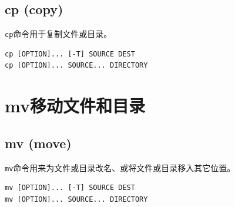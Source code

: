 \documentclass[12pt, openany, oneside]{book}
\begin{document}
\subsection{cp (copy)}

\lstinline|cp|命令用于复制文件或目录。

\vspace{-0.5cm}
\begin{lstlisting}
cp [OPTION]... [-T] SOURCE DEST
cp [OPTION]... SOURCE... DIRECTORY
\end{lstlisting}

\begin{table}[H]
	\centering
	\caption{\lstinline|cp|参数说明}
\end{table}

\newpage

\section{mv移动文件和目录}

\subsection{mv (move)}

\lstinline|mv|命令用来为文件或目录改名、或将文件或目录移入其它位置。

\vspace{-0.5cm}
\begin{lstlisting}
mv [OPTION]... [-T] SOURCE DEST
mv [OPTION]... SOURCE... DIRECTORY
\end{lstlisting}
\end{document}
